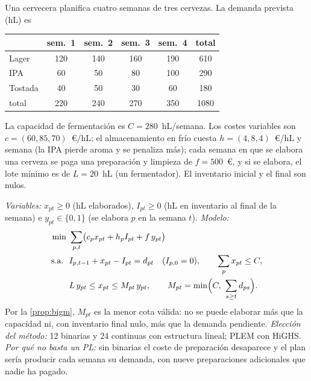 \begin{ejemplo}\label{ej:cervecera}
Una cervecera planifica cuatro semanas de tres cervezas. La demanda prevista (hL) es
\begin{center}\small
\begin{tabular}{@{}lccccc@{}}
\toprule
 & sem.~1 & sem.~2 & sem.~3 & sem.~4 & total \\
\midrule
Lager & 120 & 140 & 160 & 190 & 610 \\
IPA & 60 & 50 & 80 & 100 & 290 \\
Tostada & 40 & 50 & 30 & 60 & 180 \\
\midrule
total & 220 & 240 & 270 & 350 & 1080 \\
\bottomrule
\end{tabular}
\end{center}
La capacidad de fermentación es $C=280$~hL/semana. Los costes variables son $c=(60,85,70)$~€/hL; el almacenamiento en frío cuesta $h=(4,8,4)$~€/hL y semana (la IPA pierde aroma y se penaliza más); cada semana en que se elabora una cerveza se paga una preparación y limpieza de $f=500$~€, y si se elabora, el lote mínimo es de $L=20$~hL (un fermentador). El inventario inicial y el final son nulos.

\emph{Variables:} $x_{pt}\ge 0$ (hL elaborados), $I_{pt}\ge 0$ (hL en inventario al final de la semana) e $y_{pt}\in\{0,1\}$ (se elabora $p$ en la semana $t$). \emph{Modelo:}
\begin{align*}
\min\ &\sum_{p,t}\bigl(c_px_{pt}+h_pI_{pt}+f\,y_{pt}\bigr)\\
\st\ &I_{p,t-1}+x_{pt}-I_{pt}=d_{pt}\quad(I_{p,0}=0),\qquad \sum_p x_{pt}\le C,\\
&L\,y_{pt}\le x_{pt}\le M_{pt}\,y_{pt},\qquad M_{pt}=\min\Bigl(C,\ \sum_{s\ge t}d_{ps}\Bigr).
\end{align*}
Por la \cref{prop:bigm}, $M_{pt}$ es la menor cota válida: no se puede elaborar más que la capacidad ni, con inventario final nulo, más que la demanda pendiente. \emph{Elección del método:} 12 binarias y 24 continuas con estructura lineal; PLEM con HiGHS. \emph{Por qué no basta un PL:} sin binarias el coste de preparación desaparece y el plan sería producir cada semana su demanda, con nueve preparaciones adicionales que nadie ha pagado.


\end{ejemplo}
